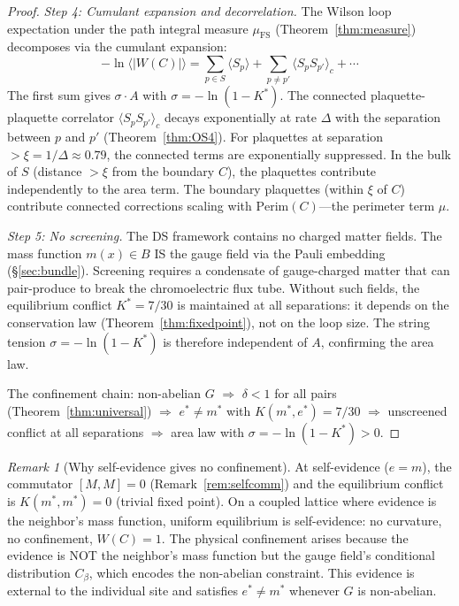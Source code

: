 \documentclass[11pt,a4paper]{article}
\theoremstyle{definition}
\theoremstyle{remark}
\newtheorem{remark}[theorem]{Remark}
\begin{document}
\begin{proof}
\emph{Step 4: Cumulant expansion and decorrelation.} The Wilson loop expectation under the path integral measure $\mu_{\mathrm{FS}}$ (Theorem~\ref{thm:measure}) decomposes via the cumulant expansion:
\[
-\ln\langle|W(C)|\rangle=\sum_{p\in S}\langle S_p\rangle+\sum_{p\neq p'}\langle S_p S_{p'}\rangle_c+\cdots
\]
The first sum gives $\sigma\cdot A$ with $\sigma=-\ln(1-K^*)$. The connected plaquette-plaquette correlator $\langle S_p S_{p'}\rangle_c$ decays exponentially at rate $\Delta$ with the separation between $p$ and $p'$ (Theorem~\ref{thm:OS4}). For plaquettes at separation $>\xi=1/\Delta\approx 0.79$, the connected terms are exponentially suppressed. In the bulk of $S$ (distance $>\xi$ from the boundary $C$), the plaquettes contribute independently to the area term. The boundary plaquettes (within $\xi$ of $C$) contribute connected corrections scaling with $\mathrm{Perim}(C)$---the perimeter term $\mu$.

\emph{Step 5: No screening.} The DS framework contains no charged matter fields. The mass function $m(x)\in B$ IS the gauge field via the Pauli embedding (\S\ref{sec:bundle}). Screening requires a condensate of gauge-charged matter that can pair-produce to break the chromoelectric flux tube. Without such fields, the equilibrium conflict $K^*=7/30$ is maintained at all separations: it depends on the conservation law (Theorem~\ref{thm:fixedpoint}), not on the loop size. The string tension $\sigma=-\ln(1-K^*)$ is therefore independent of $A$, confirming the area law.

The confinement chain: non-abelian $G$ $\Rightarrow$ $\delta<1$ for all pairs (Theorem~\ref{thm:universal}) $\Rightarrow$ $e^*\neq m^*$ with $K(m^*,e^*)=7/30$ $\Rightarrow$ unscreened conflict at all separations $\Rightarrow$ area law with $\sigma=-\ln(1-K^*)>0$.
\end{proof}

\begin{remark}[Why self-evidence gives no confinement]
At self-evidence ($e=m$), the commutator $[M,M]=0$ (Remark~\ref{rem:selfcomm}) and the equilibrium conflict is $K(m^*,m^*)=0$ (trivial fixed point). On a coupled lattice where evidence is the neighbor's mass function, uniform equilibrium is self-evidence: no curvature, no confinement, $W(C)=1$. The physical confinement arises because the evidence is NOT the neighbor's mass function but the gauge field's conditional distribution $C_\beta$, which encodes the non-abelian constraint. This evidence is external to the individual site and satisfies $e^*\neq m^*$ whenever $G$ is non-abelian.
\end{remark}
\end{document}
